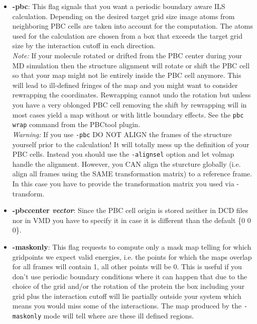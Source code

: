\begin{itemize}
    
  \item {\bf -pbc}:
    This flag signals that you want a periodic boundary aware ILS
    calculation. Depending on the desired target grid size image atoms
    from neighboring PBC cells are taken into account for the computation.
    The atoms used for the calculation are chosen from a box that exceeds
    the target grid size by the interaction cutoff in each direction.\\
    {\it Note:} If your molecule rotated or drifted from the PBC center during
    your MD simulation then the structure alignment will rotate or shift
    the PBC cell so that your map might not lie entirely inside the PBC 
    cell anymore. This will lead to ill-defined fringes of the map and you
    might want to consider rewrapping the coordinates. Rewrapping cannot
    undo the rotation but unless you have a very oblonged PBC cell
    removing the shift by rewrapping will in most cases yield a map
    without or with little boundary effects. See the {\tt pbc wrap}
    command from the PBCtool plugin.\\
    {\it Warning:} If you use {\tt -pbc} DO NOT ALIGN the frames of
    the structure yourself prior to the calculation! It will totally
    mess up the definition of your PBC cells. Instead you should use
    the {\tt -alignsel} option and let volmap handle the alignment.
    However, you CAN align the sturcture globally (i.e. align all
    frames using the SAME transformation matrix) to a reference
    frame. In this case you have to provide the transformation matrix
    you used via -transform.

  \item {\bf -pbccenter {\it vector}}:
    Since the PBC cell origin is stored neither in DCD files nor in VMD
    you have to specify it in case it is different than the default
    \{0 0 0\}.
        
  \item {\bf -maskonly}: This flag requests to compute only a mask map
    telling for which gridpoints we expect valid energies, i.e. the
    points for which the maps overlap for all frames will contain 1,
    all other points will be 0. This is useful if you don't use
    periodic boundary conditions where it can happen that due to the
    choice of the grid and/or the rotation of the protein the box
    including your grid plus the interaction cutoff will lie partially
    outside your system which means you would miss some of the
    interactions. The map produced by the {\tt -maskonly} mode will
    tell where are these ill defined regions.

\end{itemize}

